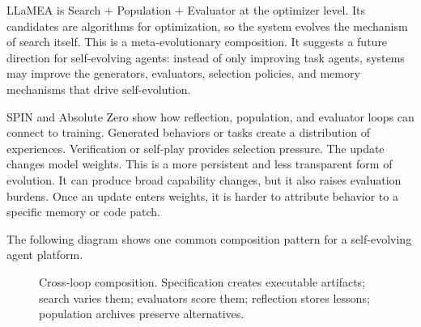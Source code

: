 LLaMEA is Search $+$ Population $+$ Evaluator at the optimizer level.  Its candidates are algorithms for optimization, so the system evolves the mechanism of search itself.  This is a meta-evolutionary composition.  It suggests a future direction for self-evolving agents: instead of only improving task agents, systems may improve the generators, evaluators, selection policies, and memory mechanisms that drive self-evolution.

SPIN and Absolute Zero show how reflection, population, and evaluator loops can connect to training.  Generated behaviors or tasks create a distribution of experiences.  Verification or self-play provides selection pressure.  The update changes model weights.  This is a more persistent and less transparent form of evolution.  It can produce broad capability changes, but it also raises evaluation burdens.  Once an update enters weights, it is harder to attribute behavior to a specific memory or code patch.

The following diagram shows one common composition pattern for a self-evolving agent platform.

\begin{figure}[t]
\centering
{}
\caption{Cross-loop composition.  Specification creates executable artifacts; search varies them; evaluators score them; reflection stores lessons; population archives preserve alternatives.}
\label{fig:cross-loop-composition}
\end{figure}

